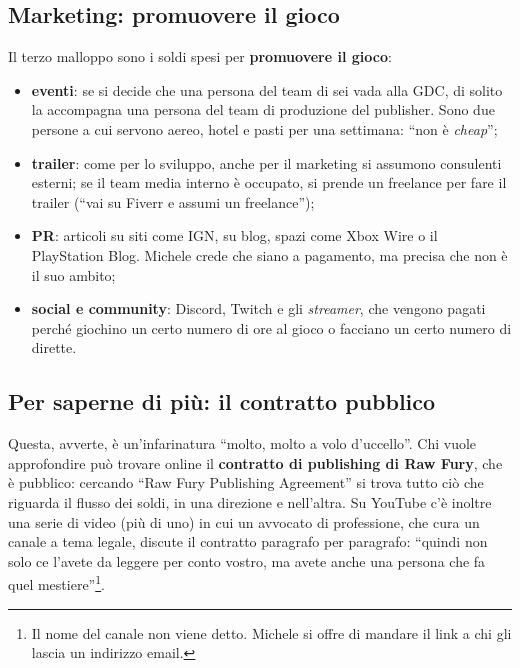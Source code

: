 \subsection{Marketing: promuovere il gioco}

Il terzo malloppo sono i soldi spesi per \textbf{promuovere il gioco}:
\begin{itemize}
  \item \textbf{eventi}: se si decide che una persona del team di sei vada
        alla GDC, di solito la accompagna una persona del team di produzione
        del publisher. Sono due persone a cui servono aereo, hotel e pasti per
        una settimana: ``non è \emph{cheap}'';
  \item \textbf{trailer}: come per lo sviluppo, anche per il marketing si
        assumono consulenti esterni; se il team media interno è occupato, si
        prende un freelance per fare il trailer (``vai su Fiverr e assumi un
        freelance'');
  \item \textbf{PR}: articoli su siti come IGN, su blog, spazi come Xbox Wire o
        il PlayStation Blog. Michele crede che siano a pagamento, ma precisa
        che non è il suo ambito;
  \item \textbf{social e community}: Discord, Twitch e gli
        \emph{streamer}, che vengono pagati perché giochino un certo numero di
        ore al gioco o facciano un certo numero di dirette.
\end{itemize}

\subsection{Per saperne di più: il contratto pubblico}

Questa, avverte, è un'infarinatura ``molto, molto a volo d'uccello''. Chi
vuole approfondire può trovare online il \textbf{contratto di publishing di Raw
Fury}, che è pubblico: cercando ``Raw Fury Publishing Agreement'' si trova
tutto ciò che riguarda il flusso dei soldi, in una direzione e nell'altra. Su
YouTube c'è inoltre una serie di video (più di uno) in cui un avvocato di
professione, che cura un canale a tema legale, discute il contratto paragrafo
per paragrafo: ``quindi non solo ce l'avete da leggere per conto vostro, ma
avete anche una persona che fa quel mestiere''\footnote{Il nome del canale non
viene detto. Michele si offre di mandare il link a chi gli lascia un indirizzo
email.}.

